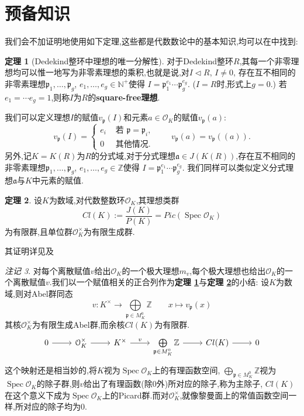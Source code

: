 \documentclass[12pt,A4paper,oneside,reqno]{amsart}
\numberwithin{equation}{section}
\theoremstyle{definition}
\newtheorem{theorem}{定理}[section]
\theoremstyle{plain}
\theoremstyle{plain}
\numberwithin{equation}{section}
\theoremstyle{remark}
\newtheorem{remark}[theorem]{注记}
\newcommand{\Spec}{\operatorname{Spec}}
\begin{document}
\section{预备知识}
我们会不加证明地使用如下定理,这些都是代数数论中的基本知识,均可以在\cite{冯克勤2000代数数论}中找到:
\begin{theorem}[Dedekind整环中理想的唯一分解性]\label{thm:idealinDede}
	对于Dedekind整环$R$,其每一个非零理想均可以惟一地写为非零素理想的乘积,也就是说,对$I \vartriangleleft R$, $I \neq 0$, 存在互不相同的非零素理想$\mathfrak{p}_1, \ldots ,\mathfrak{p}_g$, $e_1,\ldots ,e_g \in \mathbb{N}^+$使得
	$I = \mathfrak{p}_1^{e_1}\cdots\mathfrak{p}_g^{e_g}$.
	($I=R$时,形式上$g=0$.)	若$e_1=\cdots e_g=1$,则称$I$为$R$的\textbf{square-free理想}.
	
	我们可以定义理想$I$的赋值$v_{\mathfrak{p}}(I)$和元素$a \in \mathcal{O}_K$的赋值$v_{\mathfrak{p}}(a)$:
	$$v_{\mathfrak{p}}(I)=\begin{cases}
	e_i & \text{ 若 }\mathfrak{p} = \mathfrak{p}_i,\\
	0 & \text{ 其他情况.}
	\end{cases} \qquad v_{\mathfrak{p}}(a)=v_{\mathfrak{p}}((a)).$$
	另外,记$K=K(R)$为$R$的分式域,对于分式理想$\mathfrak{a} \in J(K(R))$,存在互不相同的非零素理想$\mathfrak{p}_1, \ldots ,\mathfrak{p}_g$, $e_1,\ldots ,e_g \in \mathbb{Z}$使得
	$I = \mathfrak{p}_1^{e_1}\cdots\mathfrak{p}_g^{e_g}$.
	我们同样可以类似定义分式理想$\mathfrak{a}$与$K$中元素的赋值.
\end{theorem}
\begin{theorem}\label{thm:idealclass}
	设$K$为数域,对代数整数环$\mathcal{O}_K$,其理想类群
	$$Cl(K):=\frac{J(K)}{P(K)}=Pic(\Spec \mathcal{O}_K)$$
	为有限群,且单位群$\mathcal{O}_K^{\times}$为有限生成群.
	
	其证明详见\cite[1, p105, 定理3.4]{冯克勤2000代数数论}及\cite[1, p133, 定理3.6]{冯克勤2000代数数论}
\end{theorem}
\begin{remark}
	对每个离散赋值$v$给出$\mathcal{O}_K$的一个极大理想$m_v$,每个极大理想也给出$\mathcal{O}_K$的一个离散赋值$v$.我们以一个赋值相关的正合列作为\textbf{定理 \ref{thm:idealinDede}}与\textbf{定理 \ref{thm:idealclass}}的小结:
	设$K$为数域,则对Abel群同态
	$$v: K^{\times} \longrightarrow \bigoplus\limits_{\mathfrak{p} \in M_K^{0}}\mathbb{Z} \qquad x \longmapsto v_{\mathfrak{p}}(x)$$
	其核$\mathcal{O}_K^{\times}$为有限生成Abel群,而余核$Cl(K)$为有限群.
	\begin{equation}\label{eq:exactAN}
	\begin{tikzcd}
	0 \arrow[r] & \mathcal{O}_K^{\times} \arrow[r] & K^{\times} \arrow[r, "v"] & \bigoplus\limits_{\mathfrak{p} \in M_K^{0}}\mathbb{Z} \arrow[r] & Cl(K) \arrow[r] & 0
	\end{tikzcd}	
	\end{equation}
	这个映射还是相当妙的,将$K$视为$\Spec \mathcal{O}_K$上的有理函数空间, $\bigoplus_{\mathfrak{p} \in M_K^{0}}\mathbb{Z}$视为$\Spec \mathcal{O}_K$的除子群,则$v$给出了有理函数(除$0$外)所对应的除子,称为主除子, $Cl(K)$在这个意义下成为$\Spec \mathcal{O}_K$上的Picard群.而对$\mathcal{O}_K^{\times}$,就像黎曼面上的常值函数空间一样,所对应的除子均为$0$.
\end{remark}
\end{document}
